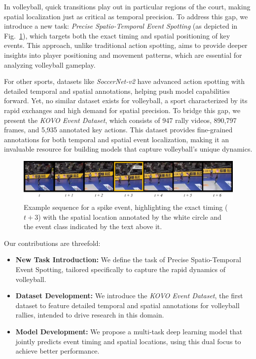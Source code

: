\documentclass[conference]{IEEEtran}
\begin{document}
In volleyball, quick transitions play out in particular regions of the court, making spatial localization just as critical as temporal precision. To address this gap, we introduce a new task: \textit{Precise Spatio-Temporal Event Spotting} (as depicted in Fig.~\ref{fig-kovo-ex}), which targets both the exact timing and spatial positioning of key events. This approach, unlike traditional action spotting, aims to provide deeper insights into player positioning and movement patterns, which are essential for analyzing volleyball gameplay.

For other sports, datasets like \textit{SoccerNet-v2} \cite{soccernetv2} have advanced action spotting with detailed temporal and spatial annotations, helping push model capabilities forward. Yet, no similar dataset exists for volleyball, a sport characterized by its rapid exchanges and high demand for spatial precision. To bridge this gap, we present the \textit{KOVO Event Dataset}, which consists of 947 rally videos, 890,797 frames, and 5,935 annotated key actions. This dataset provides fine-grained annotations for both temporal and spatial event localization, making it an invaluable resource for building models that capture volleyball's unique dynamics.

\begin{figure}[t] 
    \centering
    \includegraphics[width=\textwidth]{figures/fig-kovo-ex.jpg}
    \caption{Example sequence for a spike event, highlighting the exact timing (\(t+3\)) with the spatial location annotated by the white circle and the event class indicated by the text above it.}
    \label{fig-kovo-ex}
\end{figure}



Our contributions are threefold:
\begin{itemize}
    \item \textbf{New Task Introduction:} We define the task of Precise Spatio-Temporal Event Spotting, tailored specifically to capture the rapid dynamics of volleyball.
    \item \textbf{Dataset Development:} We introduce the \textit{KOVO Event Dataset}, the first dataset to feature detailed temporal and spatial annotations for volleyball rallies, intended to drive research in this domain.
    \item \textbf{Model Development:} We propose a multi-task deep learning model that jointly predicts event timing and spatial locations, using this dual focus to achieve better performance.
\end{itemize}
\end{document}
